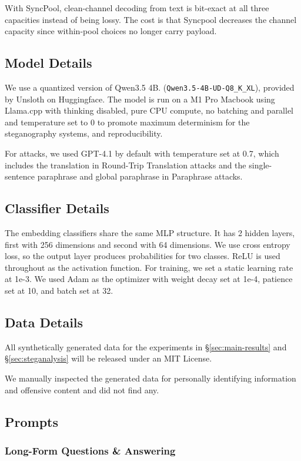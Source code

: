 With SyncPool, clean-channel decoding from text is bit-exact at all three capacities instead of being lossy. The cost is that Syncpool decreases the channel capacity since within-pool choices no longer carry payload.

\subsection{Model Details}
We use a quantized version of Qwen3.5 4B. (\texttt{Qwen3.5-4B-UD-Q8\_K\_XL}), provided by Unsloth on Huggingface. The model is run on a M1 Pro Macbook using Llama.cpp with thinking disabled, pure CPU compute, no batching and parallel and temperature set to 0 to promote maximum determinism for the steganography systems, and reproducibility.

For attacks, we used GPT-4.1 by default with temperature set at 0.7, which includes the translation in Round-Trip Translation attacks and the single-sentence paraphrase and global paraphrase in Paraphrase attacks.

\subsection{Classifier Details}
The embedding classifiers share the same MLP structure. It has 2 hidden layers, first with 256 dimensions and second with 64 dimensions. We use cross entropy loss, so the output layer produces probabilities for two classes. ReLU \cite{nair2010rectified} is used throughout as the activation function. For training, we set a static learning rate at 1e-3. We used Adam \cite{kingma2017adammethodstochasticoptimization} as the optimizer with weight decay set at 1e-4, patience set at 10, and batch set at 32.

\subsection{Data Details}
All synthetically generated data for the experiments in \S\ref{sec:main-results} and \S\ref{sec:steganalysis} will be released under an MIT License.

We manually inspected the generated data for personally identifying information and offensive content and did not find any.

\subsection{Prompts}

\subsubsection{Long-Form Questions \& Answering}

